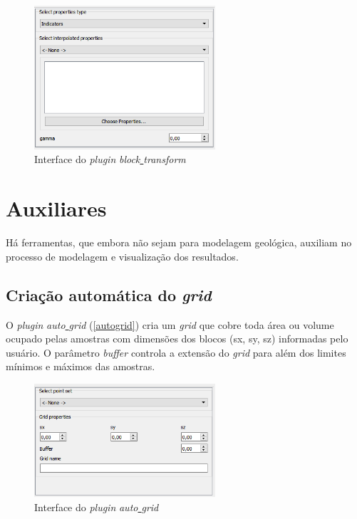 \begin{figure}[H]
	\caption{\label{bltrans}Interface do \textit{plugin} \textit{block\underline{ }transform}}
	\centering
		\includegraphics[width=0.6\textwidth]{apendice_a/imagens/block_tr.PNG}
\end{figure}

\section{Auxiliares}

Há ferramentas, que embora não sejam para modelagem geológica, auxiliam no processo de modelagem e visualização dos resultados.

\subsection{Criação automática do \textit{grid}}

O \textit{plugin} \textit{auto\underline{ }grid} (\autoref{autogrid}) cria um \textit{grid} que cobre toda área ou volume ocupado pelas amostras com dimensões dos blocos (sx, sy, sz) informadas pelo usuário. O parâmetro \textit{buffer} controla a extensão do \textit{grid} para além dos limites mínimos e máximos das amostras.

\begin{figure}[H]
	\caption{\label{autogrid}Interface do \textit{plugin} \textit{auto\underline{ }grid}}
	\centering
		\includegraphics[width=0.6\textwidth]{apendice_a/imagens/autogrid.PNG}
\end{figure}

